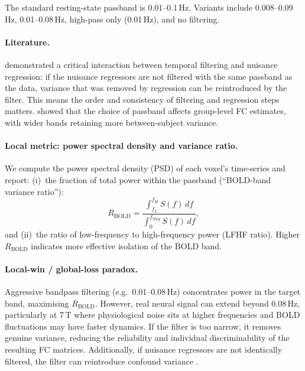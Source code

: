 \documentclass[11pt,a4paper]{article}
\begin{document}
The standard resting-state passband is 0.01--0.1\,Hz.  Variants include 0.008--0.09\,Hz, 0.01--0.08\,Hz, high-pass only (0.01\,Hz), and no filtering.

\paragraph{Literature.}
\citet{hallquist2013} demonstrated a critical interaction between temporal filtering and nuisance regression: if the nuisance regressors are not filtered with the same passband as the data, variance that was removed by regression can be reintroduced by the filter.  This means the order and consistency of filtering and regression steps matters.  \citet{caballero2017} showed that the choice of passband affects group-level FC estimates, with wider bands retaining more between-subject variance.

\paragraph{Local metric: power spectral density and variance ratio.}
We compute the power spectral density (PSD) of each voxel's time-series and report: (i)~the fraction of total power within the passband (``BOLD-band variance ratio''):
\begin{equation}
    R_{\mathrm{BOLD}} = \frac{\int_{f_L}^{f_H} S(f)\, df}{\int_{0}^{f_{\mathrm{Nyq}}} S(f)\, df},
\end{equation}
and (ii)~the ratio of low-frequency to high-frequency power (LFHF ratio).  Higher $R_{\mathrm{BOLD}}$ indicates more effective isolation of the BOLD band.

\paragraph{Local-win / global-loss paradox.}
Aggressive bandpass filtering (e.g.\ 0.01--0.08\,Hz) concentrates power in the target band, maximising $R_{\mathrm{BOLD}}$.  However, real neural signal can extend beyond 0.08\,Hz, particularly at 7\,T where physiological noise sits at higher frequencies and BOLD fluctuations may have faster dynamics.  If the filter is too narrow, it removes genuine variance, reducing the reliability and individual discriminability of the resulting FC matrices.  Additionally, if nuisance regressors are not identically filtered, the filter can reintroduce confound variance \citep{hallquist2013}.

\end{document}
